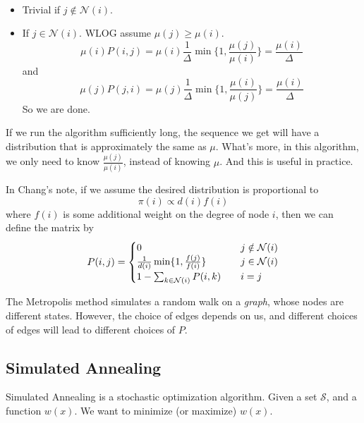         \begin{sketchproof}~{}
            \begin{itemize}
                \item Trivial if $j \notin \mathcal{N}(i)$.
                \item If $j \in \mathcal{N}(i)$. WLOG assume $\mu(j) \ge \mu(i)$.
                \[ \mu(i)P(i,j) = \mu(i)\frac{1}{\Delta}\min\{1,\frac{\mu(j)}{\mu(i)}\} = \frac{\mu(i)}{\Delta} \]
                and
                \[ \mu(j)P(j,i) = \mu(j)\frac{1}{\Delta}\min\{1,\frac{\mu(i)}{\mu(j)}\} = \frac{\mu(i)}{\Delta} \]
                So we are done.
            \end{itemize}
        \end{sketchproof}
        \begin{remark}
            If we run the algorithm sufficiently long, the sequence we get will have a distribution that is approximately the same as $\mu$. What's more, in this algorithm, we only need to know $\frac{\mu(j)}{\mu(i)}$, instead of knowing $\mu$. And this is useful in practice.
        \end{remark}

        In Chang's note, if we assume the desired distribution is proportional to
        \[ \pi(i) \propto d(i)f(i) \]
        where $f(i)$ is some additional weight on the degree of node $i$, then we can define the matrix by
        \begin{equation}\notag
            P(i, j) = 
            \begin{cases}
                0 \quad & j \notin \mathcal{N}(i)\\
                \frac{1}{d(i)}\min\{1, \frac{f(j)}{f(i)}\} \quad &j \in \mathcal{N}(i)\\
                1 - \sum_{k\in\mathcal{N}(i)} P(i,k) \quad & i = j
            \end{cases}
        \end{equation}

        \begin{remark}
            The Metropolis method simulates a random walk on a \emph{graph}, whose nodes are different states. However, the choice of edges depends on us, and different choices of edges will lead to different choices of $P$.
        \end{remark}

    \subsection{Simulated Annealing}
        \par Simulated Annealing is a stochastic optimization algorithm. Given a set $\mathcal{S}$, and a function $w(x)$. We want to minimize (or maximize) $w(x)$.
